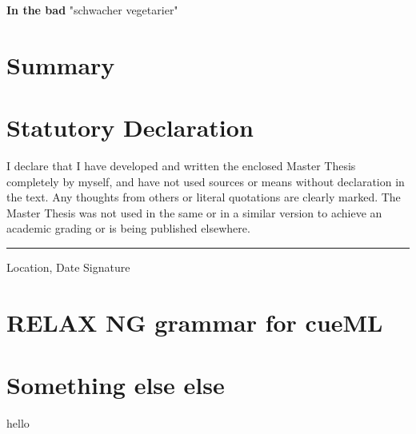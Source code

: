 \documentclass[12pt, twoside]{report}
\begin{document}
\textbf{In the bad} \parencite{clintonHealth} "schwacher vegetarier"


\chapter{Summary}


\appendix
\chapter{Statutory Declaration}
I declare that I have developed and written the enclosed Master Thesis completely by myself, and have not used sources or means without declaration in the text. Any thoughts from others or literal quotations are clearly marked. The Master Thesis was not used in the same or in a similar version to achieve an academic grading or is being published elsewhere.
\newline
\newline
\newline
\rule{\textwidth}{1pt}
Location, Date \hfill Signature 

\chapter{RELAX NG grammar for cueML}
\label{appendix:grammaCueML}

\chapter{Something else else}
hello

\printbibliography
\end{document}
